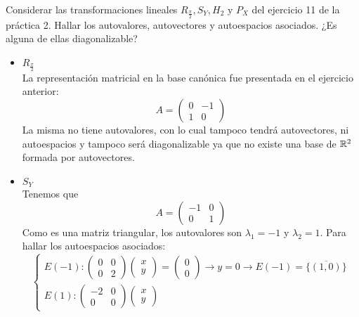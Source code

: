 \item Considerar las transformaciones lineales $R_\frac{\pi}{2},S_Y,H_2$ y $P_X$ del ejercicio 11 de la práctica 2. Hallar los autovalores, autovectores y autoespacios asociados. ¿Es alguna de ellas diagonalizable?
    \begin{mdframed}[style=s]
        \begin{itemize}
            \item $R_\frac{\pi}{2}$\\
                La representación matricial en la base canónica fue presentada en el ejercicio anterior:
                \[A=\begin{pmatrix}
                    0&-1\\1&0
                \end{pmatrix}\]
                La misma no tiene autovalores, con lo cual tampoco tendrá autovectores, ni autoespacios y tampoco será diagonalizable ya que no existe una base de $\mathbb{R}^2$ formada por autovectores.
            \item $S_Y$\\
                Tenemos que
                \[A=\begin{pmatrix}
                    -1&0\\0&1
                \end{pmatrix}\]
                Como es una matriz triangular, los autovalores son $\lambda_1=-1$ y $\lambda_2=1$. Para hallar los autoespacios asociados:\[\begin{cases}
                    E(-1):\begin{pmatrix}
                        0&0\\0&2
                    \end{pmatrix}\begin{pmatrix}
                        x\\y
                    \end{pmatrix}=\begin{pmatrix}
                        0\\0
                    \end{pmatrix}\to y=0\to E(-1)=\overline{\{(1,0)\}}\\
                    E(1):\begin{pmatrix}
                        -2&0\\0&0
                    \end{pmatrix}\begin{pmatrix}
                        x\\y

\end{pmatrix}
\end{cases}\]
\end{itemize}
\end{mdframed}
